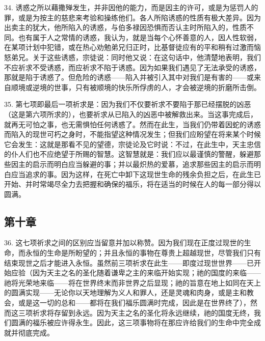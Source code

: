 34. 诱惑之所以藉撒殚发生，并非因他的能力，而是因主的许可，或是为惩罚人的罪，或是为按主的慈悲来考验和操练他们。各人所陷诱惑的性质有极大差异。因为出卖主的犹大，他所陷入的诱惑，与伯多禄因恐惧而否认主时所陷入的，性质不同。也有属于人之常情的诱惑，我认为，就是当每个心怀善意的人，因人性软弱，在某项计划中犯错，或在热心劝勉弟兄归正时，比基督徒应有的平和稍有过激而恼怒弟兄。关于这些诱惑，宗徒说：同时他又说：在这句话中，他清楚地表明，我们不应祈求不受诱惑，而应祈求不陷于诱惑。因为如果我们遇见了无法承受的诱惑，那就是陷于诱惑了。但危险的诱惑——陷入并被引入其中对我们是有害的——或来自顺境或逆境的世事，只有被顺境的快乐所俘虏的人，才会被逆境的折磨所击倒。\par

35. 第七项即最后一项祈求是：因为我们不仅要祈求不要陷于那已经摆脱的凶恶（这是第六项所求的），也要祈求从已陷入的凶恶中被解救出来。当这事完成后，就再无可怕之事，也无需惧怕任何诱惑了。然而在此生，当我们仍带着因蛇的诱惑而陷入的现世可朽之身时，不能指望这种情况发生；但我们应盼望在将来某个时候它会发生：这就是那看不见的望德，宗徒论及它时说：不过，在此生中，天主忠信的仆人们也不应绝望于所赐的智慧。这智慧就是：我们应以最谨慎的警醒，躲避那些因主的启示而明白应当躲避的事；并以最炽热的爱慕，追求那些因主的启示而明白应当追求的事。因为这样，在死亡中卸下这现世生命的残余负担之后，在此生已开始、并时常竭尽全力去把握和确保的福乐，将在适当的时候在人的每一部分得以圆满。\par


\subsection{第十章}

36. 这七项祈求之间的区别应当留意并加以称赞。因为我们现在正度过现世的生命，而永恒的生命是所盼望的；并且永恒的事物在尊贵上超越现世，尽管我们只有结束现世之后才能进入永恒。虽然前三项祈求在此生——即度过现世世界——已开始应验（因为天主之名的圣化随着谦卑之主的来临开始实现；祂的国度的来临——祂将光荣地来临——将在世界终末而非世界之后显现；祂的旨意在地上如同在天上的圆满实现——无论你以天地理解为义人和罪人，还是灵魂和肉身，或是主和教会，或是这一切的总和——都将在我们福乐圆满时完成，因此是在世界终了），然而这三项祈求将存留到永远。因为天主之名的圣化将永远继续，祂的国度无终，我们圆满的福乐被应许得永生。因此，这三项事物将在那应许给我们的生命中完全成就并彻底完成。\par

